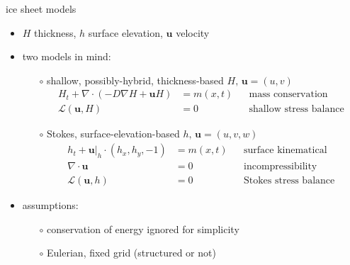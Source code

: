\documentclass[hide notes,intlimits,usenames,dvipsnames]{beamer}
\newcommand{\Div}{\nabla\cdot}
\newcommand{\grad}{\nabla}
\begin{document}
\begin{frame}{ice sheet models}

\begin{itemize}
\item $H$ thickness, $h$ surface elevation, $\mathbf{u}$ velocity
\item two models in mind:
    \begin{itemize}
    \item[$\circ$] shallow, possibly-hybrid, thickness-based \hfill {\scriptsize\color{Gray} $H,\, \mathbf{u}=(u,v)$}
        \begin{align*}
        H_t + \Div (-D \grad H + \mathbf{u} H) &= m(x,t) && \text{mass conservation} \\
        \mathcal{L}(\mathbf{u},H) &= 0      && \text{shallow stress balance}
        \end{align*}
    \item[$\circ$] Stokes, surface-elevation-based \hfill {\scriptsize\color{Gray} $h,\, \mathbf{u}=(u,v,w)$}
        \begin{align*}
        h_t + \mathbf{u}\big|_h \cdot (h_x,h_y,-1) &= m(x,t) && \text{surface kinematical} \\
        \Div \mathbf{u} &= 0            && \text{incompressibility} \\
        \mathcal{L}(\mathbf{u},h) &= 0  && \text{Stokes stress balance}
        \end{align*}
    \end{itemize}
\item assumptions:
    \begin{itemize}
    \item[$\circ$] conservation of energy ignored for simplicity
    \item[$\circ$] Eulerian, fixed grid (structured or not)
    \end{itemize}
\end{itemize}
\end{frame}
\end{document}
